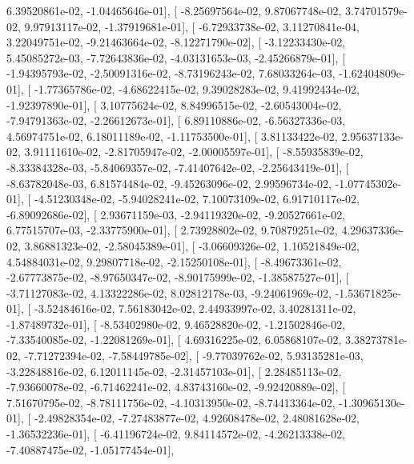 \documentclass{article}
\begin{document}
          6.39520861e-02,  -1.04465646e-01],
       [ -8.25697564e-02,   9.87067748e-02,   3.74701579e-02,
          9.97913117e-02,  -1.37919681e-01],
       [ -6.72933738e-02,   3.11270841e-04,   3.22049751e-02,
         -9.21463664e-02,  -8.12271790e-02],
       [ -3.12233430e-02,   5.45085272e-03,  -7.72643836e-02,
         -4.03131653e-03,  -2.45266879e-01],
       [ -1.94395793e-02,  -2.50091316e-02,  -8.73196243e-02,
          7.68033264e-03,  -1.62404809e-01],
       [ -1.77365786e-02,  -4.68622415e-02,   9.39028283e-02,
          9.41992434e-02,  -1.92397890e-01],
       [  3.10775624e-02,   8.84996515e-02,  -2.60543004e-02,
         -7.94791363e-02,  -2.26612673e-01],
       [  6.89110886e-02,  -6.56327336e-03,   4.56974751e-02,
          6.18011189e-02,  -1.11753500e-01],
       [  3.81133422e-02,   2.95637133e-02,   3.91111610e-02,
         -2.81705947e-02,  -2.00005597e-01],
       [ -8.55935839e-02,  -8.33384328e-03,  -5.84069357e-02,
         -7.41407642e-02,  -2.25643419e-01],
       [ -8.63782048e-03,   6.81574484e-02,  -9.45263096e-02,
          2.99596734e-02,  -1.07745302e-01],
       [ -4.51230348e-02,  -5.94028241e-02,   7.10073109e-02,
          6.91710117e-02,  -6.89092686e-02],
       [  2.93671159e-03,  -2.94119320e-02,  -9.20527661e-02,
          6.77515707e-03,  -2.33775900e-01],
       [  2.73928802e-02,   9.70879251e-02,   4.29637336e-02,
          3.86881323e-02,  -2.58045389e-01],
       [ -3.06609326e-02,   1.10521849e-02,   4.54884031e-02,
          9.29807718e-02,  -2.15250108e-01],
       [ -8.49673361e-02,  -2.67773875e-02,  -8.97650347e-02,
         -8.90175999e-02,  -1.38587527e-01],
       [ -3.71127083e-02,   4.13322286e-02,   8.02812178e-03,
         -9.24061969e-02,  -1.53671825e-01],
       [ -3.52484616e-02,   7.56183042e-02,   2.44933997e-02,
          3.40281311e-02,  -1.87489732e-01],
       [ -8.53402980e-02,   9.46528820e-02,  -1.21502846e-02,
         -7.33540085e-02,  -1.22081269e-01],
       [  4.69316225e-02,   6.05868107e-02,   3.38273781e-02,
         -7.71272394e-02,  -7.58449785e-02],
       [ -9.77039762e-02,   5.93135281e-03,  -3.22848816e-02,
          6.12011145e-02,  -2.31457103e-01],
       [  2.28485113e-02,  -7.93660078e-02,  -6.71462241e-02,
          4.83743160e-02,  -9.92420889e-02],
       [  7.51670795e-02,  -8.78111756e-02,  -4.10313950e-02,
         -8.74413364e-02,  -1.30965130e-01],
       [ -2.49828354e-02,  -7.27483877e-02,   4.92608478e-02,
          2.48081628e-02,  -1.36532236e-01],
       [ -6.41196724e-02,   9.84114572e-02,  -4.26213338e-02,
         -7.40887475e-02,  -1.05177454e-01],
\end{document}
